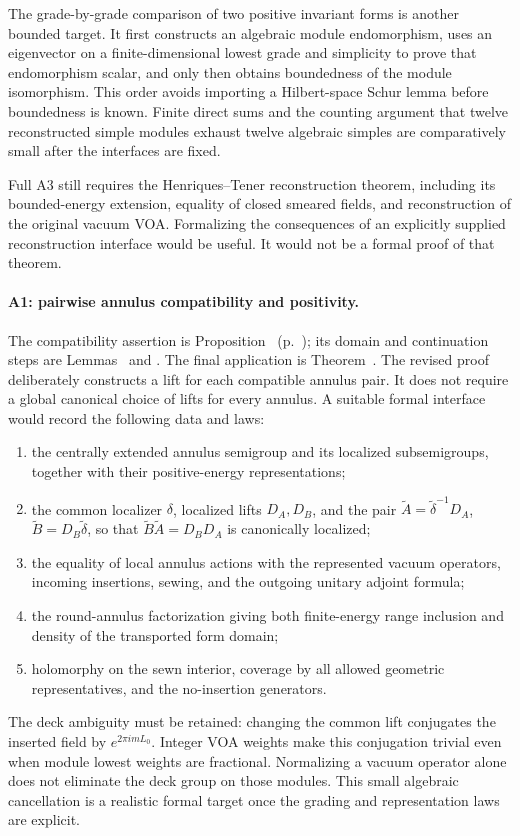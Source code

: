 The grade-by-grade comparison of two positive invariant forms is another
bounded target. It first constructs an algebraic module endomorphism,
uses an eigenvector on a finite-dimensional lowest grade and simplicity
to prove that endomorphism scalar, and only then obtains boundedness of
the module isomorphism. This order avoids importing a Hilbert-space
Schur lemma before boundedness is known. Finite direct sums and the
counting argument that twelve reconstructed simple modules exhaust
twelve algebraic simples are comparatively small after the interfaces
are fixed.

Full A3 still requires the Henriques--Tener reconstruction theorem,
including its bounded-energy extension, equality of closed smeared
fields, and reconstruction of the original vacuum VOA. Formalizing
the consequences of an explicitly supplied reconstruction interface
would be useful. It would not be a formal proof of that theorem.

\paragraph{A1: pairwise annulus compatibility and positivity.}
The compatibility assertion is
Proposition~
(p.~); its domain and continuation steps
are Lemmas~ and
. The final application is
Theorem~.
The revised proof deliberately constructs a lift for each compatible
annulus pair. It does not require a global canonical choice of lifts
for every annulus. A suitable formal interface would record the
following data and laws:
\begin{enumerate}
\item the centrally extended annulus semigroup and its localized
subsemigroups, together with their positive-energy representations;
\item the common localizer $\delta$, localized lifts $D_A,D_B$, and
the pair $\widetilde A=\widetilde\delta^{-1}D_A$,
$\widetilde B=D_B\widetilde\delta$, so that
$\widetilde B\widetilde A=D_BD_A$ is canonically localized;
\item the equality of local annulus actions with the represented
vacuum operators, incoming insertions, sewing, and the outgoing
unitary adjoint formula;
\item the round-annulus factorization giving both finite-energy
range inclusion and density of the transported form domain;
\item holomorphy on the sewn interior, coverage by all allowed
geometric representatives, and the no-insertion generators.
\end{enumerate}
The deck ambiguity must be retained: changing the common lift conjugates
the inserted field by $e^{2\pi i mL_0}$. Integer VOA weights make this
conjugation trivial even when module lowest weights are fractional.
Normalizing a vacuum operator alone does not eliminate the deck group
on those modules. This small algebraic cancellation is a realistic
formal target once the grading and representation laws are explicit.

